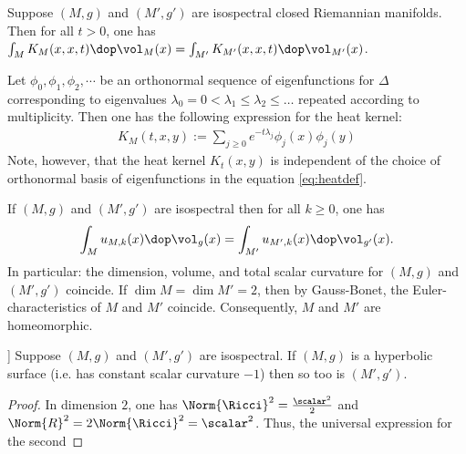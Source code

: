\begin{proposition}
  Suppose $(M,g)$ and $(M',g')$ are isospectral closed Riemannian manifolds.  Then for all $t>0$, one has $\int_M K_M(x,x,t) \dop \vol_M(x) = \int_{M'} K_{M'}(x,x,t)\dop \vol_{M'}(x)$.
\end{proposition}
Let $\phi_0,\phi_1,\phi_2,\cdots$ be an orthonormal sequence of eigenfunctions for $\Delta$ corresponding to eigenvalues $\lambda_0=0 <\lambda_1 \leq \lambda_2 \leq \dots$ repeated according to multiplicity.  Then one has the following expression for the heat kernel:
\begin{align}\label{eq:heatdef}
  K_M(t,x,y):= \sum_{j\geq 0} e^{-t\lambda_j} \phi_j(x)\phi_j(y)
\end{align}
Note, however, that the heat kernel $K_t(x,y)$ is independent of the choice of orthonormal basis of eigenfunctions in the equation \ref{eq:heatdef}.
\begin{corollary}
  If $(M,g)$ and $(M',g')$ are isospectral then for all $k\geq 0$, one has
  \begin{align}
    \int_M u_{M,k}(x) \dop \vol_g(x)  = \int_{M'} u_{M',k}(x) \dop \vol_{g'}(x).
  \end{align}
  In particular: the dimension, volume, and total scalar curvature for $(M,g)$ and $(M',g')$ coincide. If $\dim M = \dim M' = 2$, then by Gauss-Bonet, the Euler-characteristics of $M$ and $M'$ coincide.  Consequently, $M$ and $M'$ are homeomorphic.
\end{corollary}

\begin{proposition}[prop. E.IV.15 in]\cite{Berger.Gauduchon.Mazet-[SpectreVarieteRiemannienne]1971a}]
  Suppose  $(M,g)$ and $(M',g')$ are isospectral. If $(M,g)$ is  a hyperbolic surface (i.e. has constant scalar curvature $-1$)  then so too is $(M',g')$.
\end{proposition}
\begin{proof}
  In dimension $2$, one has $\Norm{\Ricci}^2 = \frac{\scalar^2}{2}$ and $\Norm{R}^2 = 2 \Norm{\Ricci}^2 = \scalar^2$. Thus, the universal expression for the second 
\end{proof}
\newpage



